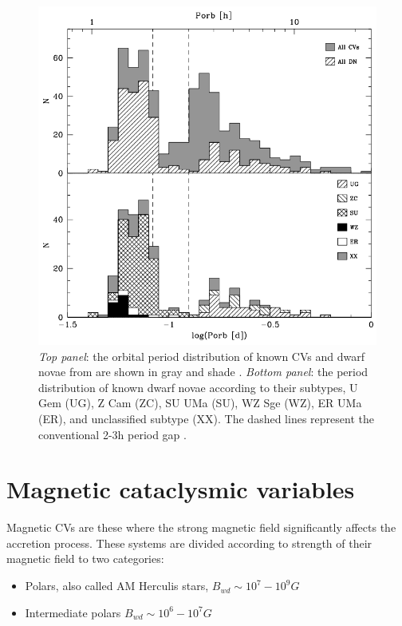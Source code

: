 \documentclass[oneside,a4paper,11pt]{report}
\begin{document}
\begin{figure}[hbt!]
\centering
\includegraphics[totalheight=12.5cm]{plot/cv_orbper.png}
\caption{\textit{Top panel}: the orbital period distribution of known CVs and dwarf novae from are shown in gray and 
shade \citet{2003A&A...404..301R}. \textit{Bottom panel}: the period distribution of known dwarf novae according to their subtypes, U Gem (UG), 
Z Cam (ZC), SU UMa (SU), WZ Sge (WZ), ER UMa (ER), and unclassified subtype (XX). The dashed lines represent the conventional 
2-3h period gap \citet{Aungwerojwit}.}
\label{cv_orb1} 
\end{figure}

\section{Magnetic cataclysmic variables}
Magnetic CVs are these where the strong magnetic field significantly affects the accretion process. These systems are divided 
according to strength of their magnetic field to two categories: 
\begin{itemize}
 \item Polars, also called AM Herculis stars, $B_{wd} \sim 10^7 - 10^9 G$  
 \item Intermediate polars $B_{wd} \sim 10^6 - 10^7 G$
\end{itemize}
\end{document}
